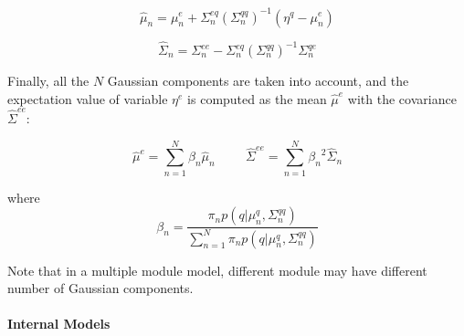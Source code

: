 \begin{table}
{\begin{minipage}[t]{1\textwidth}
            \begin{equation}
            {
            \hat{\mu}_{n} = {\mu}_{n}^e + \Sigma_{n}^{eq}({\Sigma}_{n}^{qq})^{-1}(\eta^q-{\mu}_{n}^e)
            }
            \end{equation}

            \begin{equation}
            {
            \hat{\Sigma}_{n} = {\Sigma}_{n}^{ee} - {\Sigma}_{n}^{eq}({\Sigma}_{n}^{qq})^{-1}{\Sigma}_{n}^{qe}
            }
            \end{equation}


            Finally, all the $N$ Gaussian components are taken into
            account, and the expectation value of variable $\eta^e$ is
            computed as the mean $\hat{\mu}^e$ with the covariance
            $\hat{\Sigma}^{ee}$:

            \begin{equation}
            {
            \hat{\mu}^{e} = \sum_{n=1}^N{\beta_n}\hat{\mu}_{n}
            }
            \hspace{1cm}
            {
            \hat{\Sigma}^{ee} = \sum_{n=1}^N{\beta_n}^2\hat{\Sigma}_{n}
            }
            \end{equation}

            where
            \begin{equation}
            {
            \beta_n = \frac{\pi_{n}p(q|{\mu}_{n}^q,{\Sigma}_{n}^{qq})}
            {\sum_{n=1}^N{\pi_n}p(q|{\mu}_{n}^q,{\Sigma}_{n}^{qq})}
            }
            \end{equation}

            Note that in a multiple module model, different module may have different number of Gaussian components.
        \end{minipage}
    }

\label{tab:GMM}
\end{table}



\paragraph{Internal Models}


